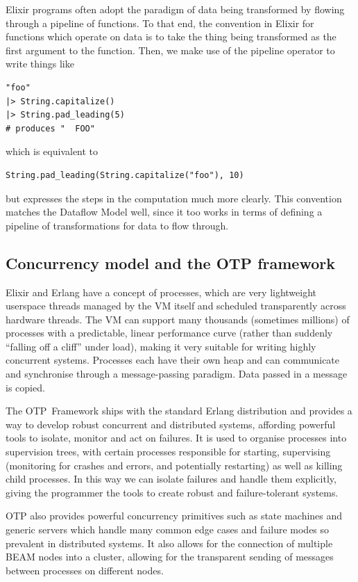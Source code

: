 Elixir programs often adopt the paradigm of data being transformed by flowing through a pipeline of functions.
To that end, the convention in Elixir for functions which operate on data is to take the thing being transformed as the first argument to the function.
Then, we make use of the pipeline operator \exs{|>} to write things like
\begin{verbatim}
"foo"
|> String.capitalize()
|> String.pad_leading(5)
# produces "  FOO"
\end{verbatim}
which is equivalent to
\begin{verbatim}
String.pad_leading(String.capitalize("foo"), 10)		
\end{verbatim}
but expresses the steps in the computation much more clearly.
This convention matches the Dataflow Model well, since it too works in terms of defining a pipeline of transformations for data to flow through.

\subsection{Concurrency model and the OTP framework}

Elixir and Erlang have a concept of processes, which are very lightweight userspace threads managed by the VM itself and scheduled transparently across hardware threads.
The VM can support many thousands (sometimes millions) of processes with a predictable, linear performance curve (rather than suddenly ``falling off a cliff'' under load), making it very suitable for writing highly concurrent systems.
Processes each have their own heap and can communicate and synchronise through a message-passing paradigm.
Data passed in a message is copied.

The OTP\footnotemark\ Framework ships with the standard Erlang distribution and provides a way to develop robust concurrent and distributed systems, affording powerful tools to isolate, monitor and act on failures.
It is used to organise processes into supervision trees, with certain processes responsible for starting, supervising (monitoring for crashes and errors, and potentially restarting) as well as killing child processes.
In this way we can isolate failures and handle them explicitly, giving the programmer the tools to create robust and failure-tolerant systems.


OTP also provides powerful concurrency primitives such as state machines and generic servers which handle many common edge cases and failure modes so prevalent in distributed systems.
It also allows for the connection of multiple BEAM nodes into a cluster, allowing for the transparent sending of messages between processes on different nodes.

